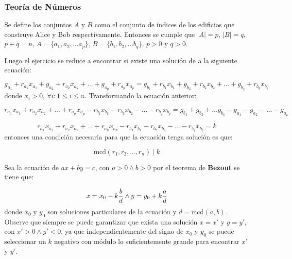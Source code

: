 \documentclass{article}
\begin{document}
\subsubsection{Teoría de Números}

Se define los conjuntos $A$ y $B$ como el conjunto de índices de los edificios que construye Alice y Bob respectivamente. Entonces
se cumple que $|A|=p$, $|B|=q$, $p+q=n$, $A=\{ a_1, a_2, \ldots a_p\}$, $B=\{ b_1, b_2, \ldots b_q\}$, $p>0$ y $q>0$.

Luego el ejercicio se reduce a encontrar si existe una solución de a la siguiente ecuación:

\begin{equation}
    g_{a_1}+r_{a_1}x_{a_1}+g_{a_2}+r_{a_2}x_{a_2}+\ldots +g_{a_p}+r_{a_p}x_{a_p}=g_{b_1}+r_{b_1}x_{b_1}+g_{b_2}+r_{b_2}x_{b_2}+\ldots +g_{b_q}+r_{b_q}x_{b_q}
\end{equation}
donde  $x_i > 0$, $\forall i : 1\leq i\leq n$. Transformando la ecuación anterior:

\begin{equation}
    r_{a_1}x_{a_1}+r_{a_2}x_{a_2}+\ldots +r_{a_p}x_{a_p}-r_{b_1}x_{b_1}-r_{b_2}x_{b_2}-\ldots -r_{b_q}x_{b_q}=g_{b_1}+g_{b_2}+\ldots g_{b_q}-g_{a_1}-g_{a_2}-\ldots -g_{a_p}
\end{equation}

\begin{equation}
    r_{a_1}x_{a_1}+r_{a_2}x_{a_2}+\ldots +r_{a_p}x_{a_p}-r_{b_1}x_{b_1}-r_{b_2}x_{b_2}-\ldots -r_{b_q}x_{b_q}=k
\end{equation}
entonces una condición necesaria para que la ecuación tenga solución es que:

\begin{equation}
    \text{mcd}(r_1, r_2, \ldots, r_n) \mid k
\end{equation}

Sea la ecuación de $ax+by=c$, con $a>0 \wedge b>0$ por el teorema de \textbf{Bezout} se tiene que:

\begin{equation}
    x=x_0-k{b\over d} \wedge y=y_0+k{a\over d}
\end{equation}
donde $x_0$ y $y_0$ son soluciones particulares de la ecuación y $d=\text{mcd}(a,b)$. Observe que siempre se puede garantizar
que exista una solución $x=x'$ y $y=y'$, con $x'>0 \wedge y'<0$, ya que independientemente del signo de $x_0$ y $y_0$ se puede
seleccionar un $k$ negativo con módulo lo suficientemente grande para encontrar $x'$ y $y'$.
\end{document}
